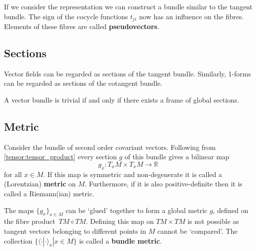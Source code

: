 	\begin{example}[Pseudovectors]
		If we consider the representation  we can construct a bundle similar to the tangent bundle. The sign of the cocycle functions $t_{ji}$ now has an influence on the fibres. Elements of these fibres are called \textbf{pseudovectors}.
	\end{example}
	
	
	
\subsection{Sections}
	\begin{remark*}
		Vector fields can be regarded as sections of the tangent bundle. Similarly, 1-forms can be regarded as sections of the cotangent bundle.
	\end{remark*}
	
	\begin{property}
		A vector bundle is trivial if and only if there exists a frame of global sections.
	\end{property}

\subsection{Metric}	
	\begin{definition}[Metric]
		Consider the bundle of second order covariant vectors. Following from \ref{tensor:tensor_product} every section $g$ of this bundle gives a bilinear map \[g_x:T_xM\times T_xM\rightarrow\mathbb{R}\]
		for all $x\in M$. If this map is symmetric and non-degenerate it is called a (Lorentzian) \textbf{metric} on $M$. Furthermore, if it is also positive-definite then it is called a Riemann(ian) metric.
		
		The maps $\{g_x\}_{x\in M}$ can be `glued' together to form a global metric $g$, defined on the fibre product\footnotemark\ $TM\diamond TM$. Defining this map on $TM\times TM$ is not possible as tangent vectors belonging to different points in $M$ cannot be `compared'. The collection $\{\langle\cdot|\cdot\rangle_x|x\in M\}$ is called a \textbf{bundle metric}.
	\end{definition}
	
